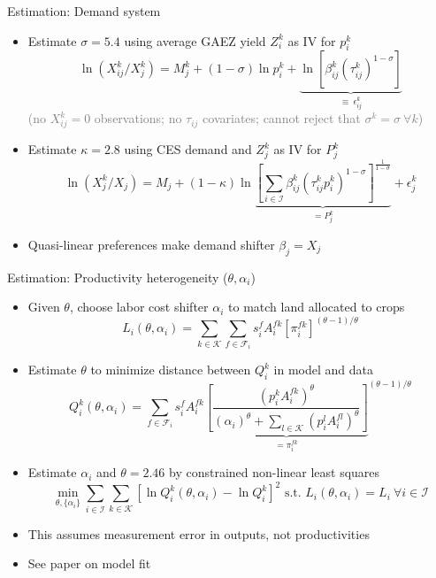 \documentclass[11pt,notes=hide,aspectratio=169]{beamer}
\begin{document}
\begin{frame}{Estimation: Demand system}
\begin{itemize}
\item Estimate $\sigma = 5.4$ using average GAEZ yield $Z_i^k$ as IV for $p_i^k$  
$$
\ln(X_{ij}^k/X_j^k) = M_j^k + (1-\sigma) \ln p_i^k + \underbrace{\ln [\beta_{ij}^k (\tau_{ij}^k)^{1-\sigma}]}_{\equiv \ \epsilon_{ij}^{k}}
$$
\textcolor{gray}{(no $X_{ij}^k = 0$ observations; no $\tau_{ij}$ covariates; cannot reject that $\sigma^k = \sigma \ \forall k$)}
\item Estimate $\kappa = 2.8$ using CES demand and $Z_j^k$ as IV for $P_j^k$
$$
\ln(X_{j}^k/X_j) = M_j + (1-\kappa) \ln \underbrace{\left[\sum_{i \in \mathcal{I}} \beta_{ij}^k \left(\tau_{ij}^k p_i^k\right)^{1-\sigma}\right]^{\frac{1}{1-\sigma}}}_{= P_j^k} + \epsilon_{j}^{k}
$$
\item Quasi-linear preferences make demand shifter $\beta_j = X_j$
\end{itemize}
\end{frame}
\begin{frame}{Estimation: Productivity heterogeneity ($\theta,\alpha_i$)}
\begin{itemize}
\item Given $\theta$, choose labor cost shifter $\alpha_i$ to match land allocated to crops
$$
L_i(\theta,\alpha_i) = \sum_{k \in \mathcal{K}} \sum_{f \in \mathcal{F}_i} s_i^f A_i^{fk} \left[\pi_{i}^{fk}\right]^{(\theta-1)/\theta}
$$
\item Estimate $\theta$ to minimize distance between $Q_i^k$ in model and data
$$
Q_i^k(\theta,\alpha_i) = \sum_{f \in \mathcal{F}_i} s_i^f A_i^{fk} {\underbrace{\left[ \frac{(p_i^k A_i^{fk})^{\theta}}{(\alpha_i)^{\theta} + \sum_{l \in \mathcal{K}} (p_i^l A_i^{fl})^{\theta}}\right]}_{= \pi_{i}^{fk}}}^{(\theta-1)/\theta}
$$
\item Estimate $\alpha_i$ and $\theta = 2.46$ by constrained non-linear least squares
$$
\min_{\theta,\{\alpha_i\}} \sum_{i \in \mathcal{I}} \sum_{k \in \mathcal{K}} \left[\ln Q_i^k(\theta,\alpha_i) - \ln Q_i^k\right]^2
\text{ s.t. } L_i(\theta,\alpha_i) = L_i \ \forall i \in \mathcal{I}
$$
\item This assumes measurement error in outputs, not productivities
\item See paper on model fit
\end{itemize}
\end{frame}
\end{document}
